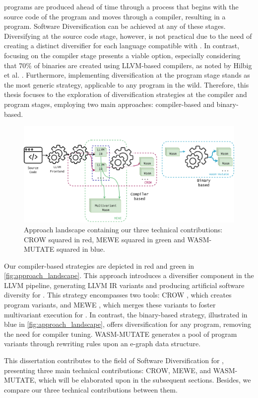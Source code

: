


\Wasm programs are produced ahead of time through a process that begins with the source code of the program and moves through a compiler, resulting in a \Wasm program. 
Software Diversification can be achieved at any of these stages. 
Diversifying at the source code stage, however, is not practical due to the need of creating a distinct diversifier for each language compatible with \Wasm. 
In contrast, focusing on the compiler stage presents a viable option, especially considering that 70\% of \Wasm binaries are created using LLVM-based compilers, as noted by Hilbig et al. \cite{Hilbig2021AnES}. 
Furthermore, implementing diversification at the \Wasm program stage stands as the most generic strategy, applicable to any \Wasm program in the wild. 
Therefore, this thesis focuses to the exploration of diversification strategies at the compiler and \Wasm program stages, employing two main approaches: compiler-based and binary-based.


\begin{figure}[h]
	\centering
	\includegraphics[width=1.0\textwidth]{figures/landscape.pdf}
	\caption{Approach landscape containing our three technical contributions: CROW squared in red, MEWE squared in green and WASM-MUTATE squared in blue.}
	\label{fig:approach_landscape}
\end{figure}

Our compiler-based strategies are depicted in red and green in \autoref{fig:approach_landscape}. 
This approach introduces a diversifier component in the LLVM pipeline, generating LLVM IR variants and producing artificial software diversity for \wasm. 
This strategy encompasses two tools: CROW \cite{CROW}, which creates \wasm program variants, and MEWE \cite{MEWE}, which merges these variants to foster multivariant execution for \wasm.
In contrast, the binary-based strategy, illustrated in blue in \autoref{fig:approach_landscape}, offers diversification for any \Wasm program, removing the need for compiler tuning. 
WASM-MUTATE \cite{wasmmutate} generates a pool of \Wasm program variants through rewriting rules upon an e-graph \cite{e-graph} data structure.


This dissertation contributes to the field of Software Diversification for \Wasm, presenting three main technical contributions: CROW, MEWE, and WASM-MUTATE, which will be elaborated upon in the subsequent sections.
Besides, we compare our three technical contributions between them.

